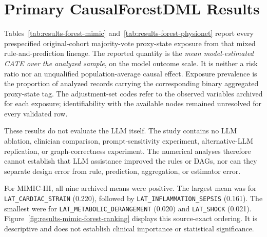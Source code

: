 \section{Primary CausalForestDML Results}
\label{sec:results:primary-causal-forest}

Tables~\ref{tab:results-forest-mimic} and~\ref{tab:results-forest-physionet} report every prespecified original-cohort majority-vote proxy-state exposure from that mixed rule-and-prediction lineage.  The reported quantity is the \emph{mean model-estimated CATE over the analyzed sample}, on the model outcome scale.  It is neither a risk ratio nor an unqualified population-average causal effect.  Exposure prevalence is the proportion of analyzed records carrying the corresponding binary aggregated proxy-state tag.  The adjustment-set codes refer to the observed variables archived for each exposure; identifiability with the available nodes remained unresolved for every validated row.

These results do not evaluate the LLM itself.  The study contains no LLM ablation, clinician comparison, prompt-sensitivity experiment, alternative-LLM replication, or graph-correctness experiment.  The numerical analyses therefore cannot establish that LLM assistance improved the rules or DAGs, nor can they separate design error from rule, prediction, aggregation, or estimator error.

For MIMIC-III, all nine archived means were positive.  The largest mean was for \nolinkurl{LAT_CARDIAC_STRAIN} (0.220), followed by \nolinkurl{LAT_INFLAMMATION_SEPSIS} (0.161).  The smallest were for \nolinkurl{LAT_METABOLIC_DERANGEMENT} (0.020) and \nolinkurl{LAT_SHOCK} (0.021).  Figure~\ref{fig:results-mimic-forest-ranking} displays this source-exact ordering.  It is descriptive and does not establish clinical importance or statistical significance.

